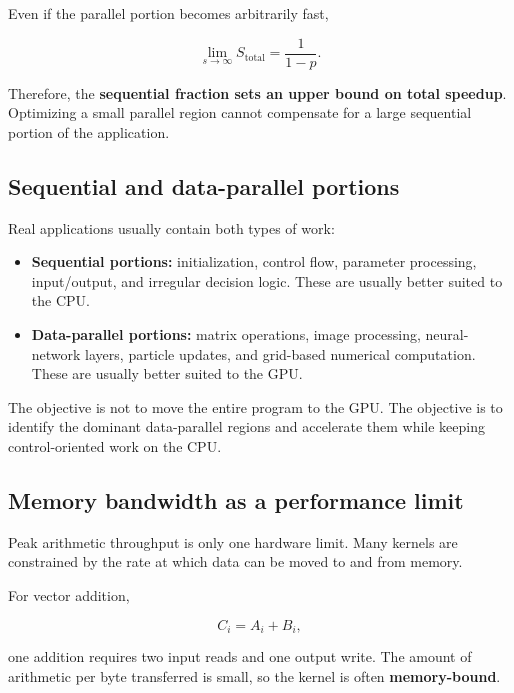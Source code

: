 \documentclass[11pt,a4paper]{article}
\begin{document}
Even if the parallel portion becomes arbitrarily fast,

\begin{equation}
\lim_{s\rightarrow\infty}S_{\mathrm{total}}
=
\frac{1}{1-p}.
\end{equation}

Therefore, the \textbf{sequential fraction sets an upper bound on total speedup}. Optimizing a small parallel region cannot compensate for a large sequential portion of the application.

\subsection{Sequential and data-parallel portions}

Real applications usually contain both types of work:

\begin{itemize}[leftmargin=2em,itemsep=3pt]
    \item \textbf{Sequential portions:} initialization, control flow, parameter processing, input/output, and irregular decision logic. These are usually better suited to the CPU.
    \item \textbf{Data-parallel portions:} matrix operations, image processing, neural-network layers, particle updates, and grid-based numerical computation. These are usually better suited to the GPU.
\end{itemize}

The objective is not to move the entire program to the GPU. The objective is to identify the dominant data-parallel regions and accelerate them while keeping control-oriented work on the CPU.

\subsection{Memory bandwidth as a performance limit}

Peak arithmetic throughput is only one hardware limit. Many kernels are constrained by the rate at which data can be moved to and from memory.

For vector addition,

\begin{equation}
C_i=A_i+B_i,
\end{equation}

one addition requires two input reads and one output write. The amount of arithmetic per byte transferred is small, so the kernel is often \textbf{memory-bound}.
\end{document}
